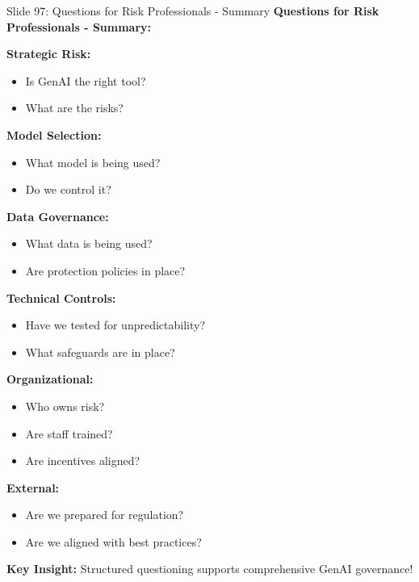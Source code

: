\documentclass[8pt]{beamer}
\begin{document}
	\begin{frame}{Slide 97: Questions for Risk Professionals - Summary}
		\fontsize{6.5}{7.5}\selectfont
		\textbf{Questions for Risk Professionals - Summary:}
		
		\vspace{0.1cm}
		\textbf{Strategic Risk:}
		\begin{itemize}
			\item Is GenAI the right tool?
			\item What are the risks?
		\end{itemize}
		
		\vspace{0.1cm}
		\textbf{Model Selection:}
		\begin{itemize}
			\item What model is being used?
			\item Do we control it?
		\end{itemize}
		
		\vspace{0.1cm}
		\textbf{Data Governance:}
		\begin{itemize}
			\item What data is being used?
			\item Are protection policies in place?
		\end{itemize}
		
		\vspace{0.1cm}
		\textbf{Technical Controls:}
		\begin{itemize}
			\item Have we tested for unpredictability?
			\item What safeguards are in place?
		\end{itemize}
		
		\vspace{0.1cm}
		\textbf{Organizational:}
		\begin{itemize}
			\item Who owns risk?
			\item Are staff trained?
			\item Are incentives aligned?
		\end{itemize}
		
		\vspace{0.1cm}
		\textbf{External:}
		\begin{itemize}
			\item Are we prepared for regulation?
			\item Are we aligned with best practices?
		\end{itemize}
		
		\textcolor{myblue}{\textbf{Key Insight:}} Structured questioning \textcolor{myblue}{supports comprehensive GenAI governance}!
	\end{frame}
	
\end{document}

